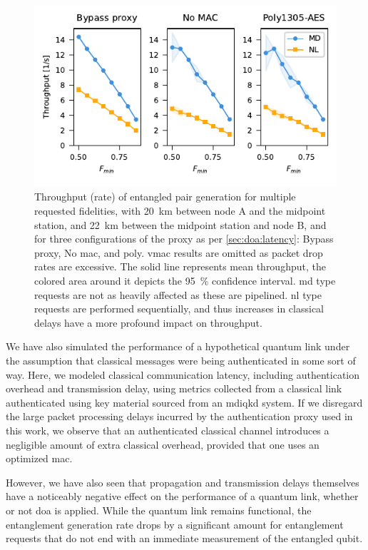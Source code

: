 \begin{figure}[t]
    \centering
    \includegraphics[width=0.6\linewidth]{figures/throughput_FCFS_mhp_150.pdf}
    \caption{
        Throughput (rate) of entangled pair generation for multiple requested fidelities, with
        \qty{20}{\km} between node A and the midpoint station, and \qty{22}{\km} between the
        midpoint station and node B, and for three configurations of the proxy as per
        \cref{sec:doa:latency}: Bypass proxy, No \acrshort{mac}, and \acrshort{poly}. \acrshort{vmac}
        results are omitted as packet drop rates are excessive. The solid line represents mean
        throughput, the colored area around it depicts the \qty{95}{\percent} confidence interval.
        \Acrfull{md} type requests are not as heavily affected as these are pipelined. \Acrfull{nl}
        type requests are performed sequentially, and thus increases in classical delays have a more
        profound impact on throughput.
    }
    \label{fig:results-fidelity}
\end{figure}

We have also simulated the performance of a hypothetical quantum link under the assumption that
classical messages were being authenticated in some sort of way. Here, we modeled classical
communication latency, including authentication overhead and transmission delay, using metrics
collected from a classical link authenticated using key material sourced from an \acrshort{mdiqkd}
system. If we disregard the large packet processing delays incurred by the authentication proxy used
in this work, we observe that an authenticated classical channel introduces a negligible amount of
extra classical overhead, provided that one uses an optimized \acrshort{mac}.

However, we have also seen that propagation and transmission delays themselves have a noticeably
negative effect on the performance of a quantum link, whether or not \acrlong{doa} is applied. While
the quantum link remains functional, the entanglement generation rate drops by a significant amount
for entanglement requests that do not end with an immediate measurement of the entangled qubit.

\begin{xstretch}
\printbibliography[heading=subbibintoc,title={References},notcategory=noprint]
\end{xstretch}

